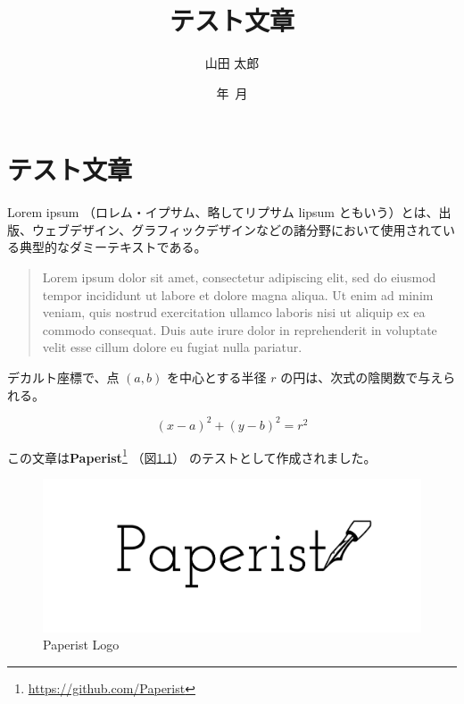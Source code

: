 \documentclass[dvipdfmx,uplatex,a4paper,10pt,oneside,onecolumn,openany]{jsbook}
\title{テスト文章}
\author{山田 太郎}
\date{{\the\year}年~{\the\month}月}
\begin{document}
\maketitle

\frontmatter
\setcounter{tocdepth}{2}
\tableofcontents

\mainmatter

\chapter{テスト文章}

Lorem ipsum\cite{loremipswikipedia:online} （ロレム・イプサム、略してリプサム lipsum ともいう）とは、出版、ウェブデザイン、グラフィックデザインなどの諸分野において使用されている典型的なダミーテキストである。

\begin{quote}

Lorem ipsum dolor sit amet, consectetur adipiscing elit, sed do eiusmod tempor incididunt ut labore et dolore magna aliqua. Ut enim ad minim veniam, quis nostrud exercitation ullamco laboris nisi ut aliquip ex ea commodo consequat. Duis aute irure dolor in reprehenderit in voluptate velit esse cillum dolore eu fugiat nulla pariatur.

\end{quote}

デカルト座標で、点 \((a, b)\) を中心とする半径 \(r\) の円は、次式の陰関数で与えられる。

\begin{equation}
(x - a)^2 + (y - b)^2 = r^2
\label{eq:circle}\end{equation}

この文章は\textbf{Paperist}\footnote{\url{https://github.com/Paperist}} （図\ref{fig:paperist}） のテストとして作成されました。

\begin{figure}[tb]
\centering
\includegraphics[keepaspectratio=true,width=0.9\linewidth,height=0.25\paperheight]{./assets/paperist-logo.png}
\caption{Paperist Logo}\label{fig:paperist}
\end{figure}

\backmatter


\end{document}
